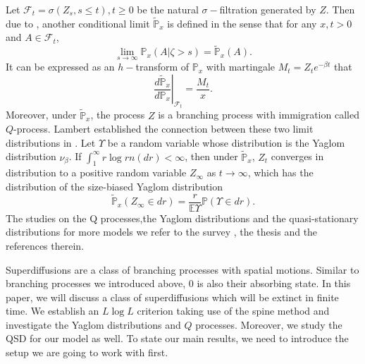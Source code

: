 \documentclass[12pt,a4paper]{amsart}
\numberwithin{equation}{section}
\theoremstyle{plain}
\theoremstyle{definition}
\begin{document}
Let $\mathcal F_t=\sigma(Z_s,s\leq t), t\geq 0$ be the natural
$\sigma-$filtration generated by $Z$. Then due to
\cite{RenSongZhang2018Williams}, another conditional limit $\widetilde{\mathbb
  P}_x$ is defined in the sense that for any $x,t>0$ and $A\in\mathcal F_t$,
\[
	\lim_{s\rightarrow\infty}\mathbb P_x(A\big|\zeta>s)=\widetilde{\mathbb P}_x(A).
\]
It can be expressed as an $h-$transform of $\mathbb P_x$ with martingale
$M_t=Z_te^{-\beta t}$ that
\[
	\left.\dfrac{d\widetilde{\mathbb P}_x}{d\mathbb P_x}\right|_{\mathcal F_t}=\frac{M_t}{x}.
\]
Moreover, under $\widetilde{\mathbb P}_x$, the process $Z$ is a branching
process with immigration called $Q$-process. Lambert established the connection
between these two limit distributions in \cite{Lambert2007Quasistationary}. Let
$\Upsilon$ be a random variable whose distribution is the Yaglom distribution
$\nu_\beta$. If $\int_1^\infty r\log r n(dr)<\infty$, then under
$\widetilde{\mathbb P}_x$, $Z_t$ converges in distribution to a positive random
variable $Z_\infty$ as $t\to\infty$, which has the distribution of the
size-biased Yaglom distribution
\[
	\widetilde{\mathbb P}_x(Z_\infty\in dr)=\frac{r}{\mathbb E\Upsilon}\mathbb P(\Upsilon\in dr).
\]
The studies on the Q processes,the Yaglom distributions and the quasi-stationary
distributions for more models we refer to the survey
\cite{MeleardVillemonais2012Quasistationary}, the thesis
\cite{Penisson2010Conditional} and the references therein.

Superdiffusions are a class of branching processes with spatial motions. Similar
to branching processes we introduced above, $0$ is also their absorbing state.
In this paper, we will discuss a class of superdiffusions which will be extinct
in finite time. We establish an $L\log L$ criterion taking use of the spine
method and investigate the Yaglom distributions and $Q$ processes. Moreover, we
study the QSD for our model as well. To state our main results, we need to
introduce the setup we are going to work with first.
\end{document}
